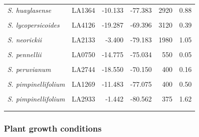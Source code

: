 \documentclass[
  letterpaper,
  DIV=11,
  numbers=noendperiod]{scrartcl}
\begin{document}
\begin{longtable}{>{\raggedright\arraybackslash}p{3.25cm}lrrrr}
\addlinespace
\em{S. huaylasense} & LA1364 & -10.133 & -77.383 & 2920 & 0.88\\
\em{\cellcolor{gray!10}{S. lycopersicoides}} & \cellcolor{gray!10}{LA2951} & \cellcolor{gray!10}{-19.317} & \cellcolor{gray!10}{-69.450} & \cellcolor{gray!10}{2200} & \cellcolor{gray!10}{0.49}\\
\em{S. lycopersicoides} & LA4126 & -19.287 & -69.396 & 3120 & 0.39\\
\em{\cellcolor{gray!10}{S. neorickii}} & \cellcolor{gray!10}{LA1322} & \cellcolor{gray!10}{-13.483} & \cellcolor{gray!10}{-72.442} & \cellcolor{gray!10}{2380} & \cellcolor{gray!10}{0.68}\\
\em{S. neorickii} & LA2133 & -3.400 & -79.183 & 1980 & 1.05\\
\addlinespace
\em{\cellcolor{gray!10}{S. pennellii}} & \cellcolor{gray!10}{LA0716} & \cellcolor{gray!10}{-16.225} & \cellcolor{gray!10}{-73.617} & \cellcolor{gray!10}{50} & \cellcolor{gray!10}{0.19}\\
\em{S. pennellii} & LA0750 & -14.775 & -75.034 & 550 & 0.05\\
\em{\cellcolor{gray!10}{S. pennellii}} & \cellcolor{gray!10}{LA3778} & \cellcolor{gray!10}{-14.775} & \cellcolor{gray!10}{-75.034} & \cellcolor{gray!10}{616} & \cellcolor{gray!10}{0.05}\\
\em{S. peruvianum} & LA2744 & -18.550 & -70.150 & 400 & 0.16\\
\em{\cellcolor{gray!10}{S. peruvianum}} & \cellcolor{gray!10}{LA2964} & \cellcolor{gray!10}{-18.028} & \cellcolor{gray!10}{-70.835} & \cellcolor{gray!10}{75} & \cellcolor{gray!10}{1.16}\\
\addlinespace
\em{S. pimpinellifolium} & LA1269 & -11.483 & -77.075 & 400 & 0.50\\
\em{\cellcolor{gray!10}{S. pimpinellifolium}} & \cellcolor{gray!10}{LA1589} & \cellcolor{gray!10}{-8.433} & \cellcolor{gray!10}{-78.817} & \cellcolor{gray!10}{30} & \cellcolor{gray!10}{0.11}\\
\em{S. pimpinellifolium} & LA2933 & -1.442 & -80.562 & 375 & 1.62\\
\em{\cellcolor{gray!10}{S. sitiens}} & \cellcolor{gray!10}{LA4116} & \cellcolor{gray!10}{-22.159} & \cellcolor{gray!10}{-68.782} & \cellcolor{gray!10}{2960} & \cellcolor{gray!10}{0.06}\\*

\end{longtable}

\subsubsection{Plant growth conditions}\label{plant-growth-conditions}
\end{document}
